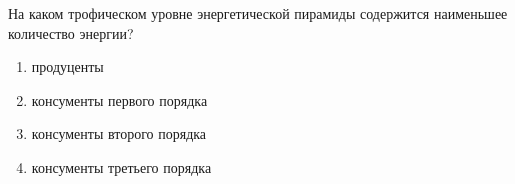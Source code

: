 
На каком трофическом уровне энергетической пирамиды содержится наименьшее количество энергии?

\begin{enumerate}
    \item продуценты
    \item консументы первого порядка 
    \item консументы второго порядка
    \item консументы третьего порядка
\end{enumerate}

\explanationSection

